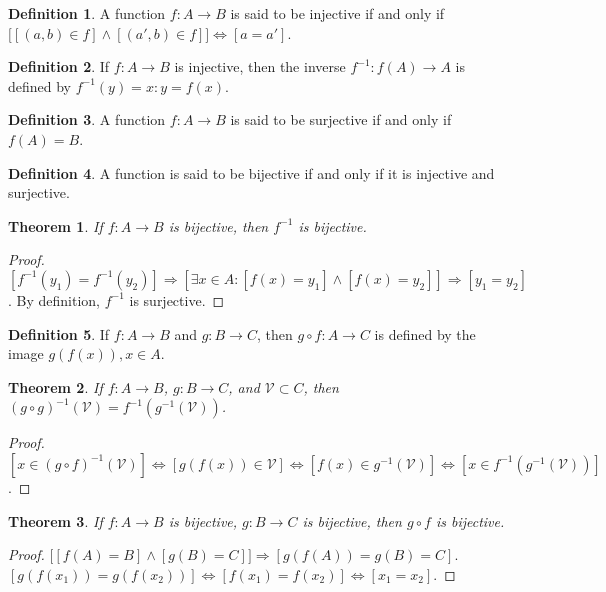 \documentclass[oneside]{book}
\newtheorem{theorem}{Theorem}[section]
\theoremstyle{definition}
\newtheorem{definition}{Definition}[section]
\begin{document}
\begin{definition}
A function $f:A\rightarrow B$ is said to be injective if and only if $\big[[(a,b)\in f]\land[(a',b)\in f]\big]\Leftrightarrow [a=a']$.
\end{definition}

\begin{definition}
If $f:A\rightarrow B$ is injective, then the inverse $f^{-1}:f(A)\rightarrow A$ is defined by $f^{-1}(y)=x:y=f(x)$.
\end{definition}

\begin{definition}
A function $f:A\rightarrow B$ is said to be surjective if and only if $f(A) = B$.
\end{definition}

\begin{definition}
A function is said to be bijective if and only if it is injective and surjective.
\end{definition}

\begin{theorem}
If $f:A\rightarrow B$ is bijective, then $f^{-1}$ is bijective.
\end{theorem}
\begin{proof}
$[f^{-1}(y_1) = f^{-1}(y_2)]\Rightarrow [\exists x\in A:[f(x) = y_1]\land [f(x)=y_2]]\Rightarrow [y_1=y_2]$. By definition, $f^{-1}$ is surjective.
\end{proof}

\begin{definition}
If $f:A\rightarrow B$ and $g:B\rightarrow C$, then $g\circ f:A\rightarrow C$ is defined by the image $g(f(x)), x\in A$. 
\end{definition}

\begin{theorem}
If $f:A\rightarrow B$, $g:B\rightarrow C$, and $\mathcal{V}\subset C$, then $(g\circ g)^{-1}(\mathcal{V}) = f^{-1}(g^{-1}(\mathcal{V}))$.
\end{theorem}
\begin{proof}
$[x\in (g\circ f)^{-1}(\mathcal{V})]\Leftrightarrow [g(f(x))\in \mathcal{V}] \Leftrightarrow [f(x)\in g^{-1}(\mathcal{V})]\Leftrightarrow [x\in f^{-1}(g^{-1}(\mathcal{V}))]$.
\end{proof}

\begin{theorem}
If $f:A\rightarrow B$ is bijective, $g:B\rightarrow C$ is bijective, then $g\circ f$ is bijective.
\end{theorem}
\begin{proof}
$\big[[f(A) = B]\land [g(B) = C]\big]\Rightarrow [g(f(A)) = g(B) = C]$. $[g(f(x_1))=g(f(x_2))]\Leftrightarrow [f(x_1)=f(x_2)]\Leftrightarrow [x_1=x_2]$.
\end{proof}
\end{document}
